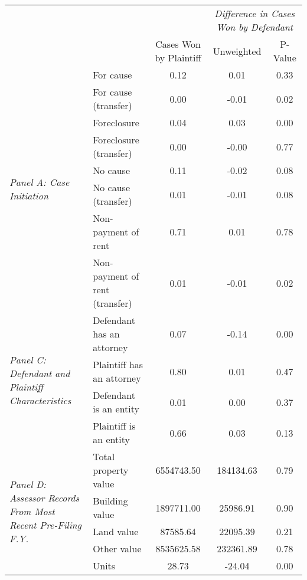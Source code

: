 \begin{tabular}{llccc}
\toprule
 &  & \textit{} & \multicolumn{2}{|c|}{\textit{Difference in Cases Won by Defendant}} \\
 &  & Cases Won by Plaintiff & Unweighted & P-Value \\
\midrule
\multirow[c]{8}{4cm}{\textit{Panel A: Case Initiation}} & For cause & 0.12 & 0.01 & 0.33 \\
 & For cause (transfer) & 0.00 & -0.01 & 0.02 \\
 & Foreclosure & 0.04 & 0.03 & 0.00 \\
 & Foreclosure (transfer) & 0.00 & -0.00 & 0.77 \\
 & No cause & 0.11 & -0.02 & 0.08 \\
 & No cause (transfer) & 0.01 & -0.01 & 0.08 \\
 & Non-payment of rent & 0.71 & 0.01 & 0.78 \\
 & Non-payment of rent (transfer) & 0.01 & -0.01 & 0.02 \\
\cline{1-5}
\multirow[c]{4}{4cm}{\textit{Panel C: Defendant and Plaintiff Characteristics}} & Defendant has an attorney & 0.07 & -0.14 & 0.00 \\
 & Plaintiff has an attorney & 0.80 & 0.01 & 0.47 \\
 & Defendant is an entity & 0.01 & 0.00 & 0.37 \\
 & Plaintiff is an entity & 0.66 & 0.03 & 0.13 \\
\cline{1-5}
\multirow[c]{5}{4cm}{\textit{Panel D: Assessor Records From Most Recent Pre-Filing F.Y.}} & Total property value & 6554743.50 & 184134.63 & 0.79 \\
 & Building value & 1897711.00 & 25986.91 & 0.90 \\
 & Land value & 87585.64 & 22095.39 & 0.21 \\
 & Other value & 8535625.58 & 232361.89 & 0.78 \\
 & Units & 28.73 & -24.04 & 0.00 \\
\cline{1-5}
\bottomrule
\end{tabular}
